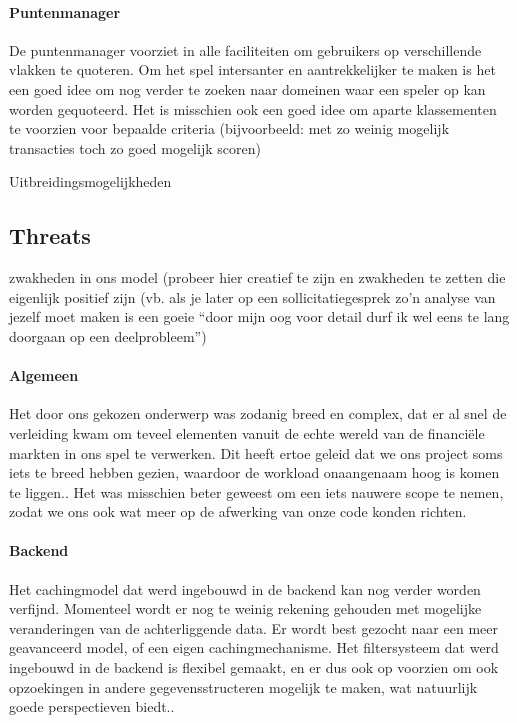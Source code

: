 \paragraph{Puntenmanager} De puntenmanager voorziet in alle faciliteiten om gebruikers op verschillende vlakken te quoteren. Om het spel intersanter en aantrekkelijker te maken is het een goed idee om nog verder te zoeken naar domeinen waar een speler op kan worden gequoteerd. Het is misschien ook een goed idee om aparte klassementen te voorzien voor bepaalde criteria (bijvoorbeeld: met zo weinig mogelijk transacties toch zo goed mogelijk scoren)

\todo Uitbreidingsmogelijkheden

\subsection{Threats}

\todo zwakheden in ons model (probeer hier creatief te zijn en zwakheden te zetten die eigenlijk positief zijn (vb. als je later op een sollicitatiegesprek zo'n analyse van jezelf moet maken is een goeie ``door mijn oog voor detail durf ik wel eens te lang doorgaan op een deelprobleem'')

\paragraph{Algemeen} Het door ons gekozen onderwerp was zodanig breed en complex, dat er al snel de verleiding kwam om teveel elementen vanuit de echte wereld van de financi\"ele markten in ons spel te verwerken. Dit heeft ertoe geleid dat we ons project soms iets te breed hebben gezien, waardoor de workload onaangenaam hoog is komen te liggen.. Het was misschien beter geweest om een iets nauwere scope te nemen, zodat we ons ook wat meer op de afwerking van onze code konden richten.

\paragraph{Backend}
Het cachingmodel dat werd ingebouwd in de backend kan nog verder worden verfijnd. Momenteel wordt er nog te weinig rekening gehouden met mogelijke veranderingen van de achterliggende data. Er wordt best gezocht naar een meer geavanceerd model, of een eigen cachingmechanisme. Het filtersysteem dat werd ingebouwd in de backend is flexibel gemaakt, en er dus ook op voorzien om ook opzoekingen in andere gegevensstructeren mogelijk te maken, wat natuurlijk goede perspectieven biedt..

